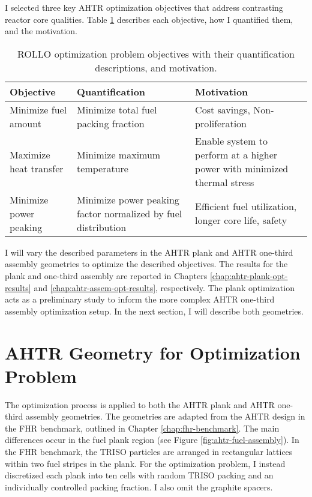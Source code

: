 I selected three key \gls{AHTR} optimization objectives that address contrasting reactor 
core qualities. 
Table \ref{tab:objectives} describes each objective, how I quantified them, and the motivation.
\begin{table}[]
    \centering
    \onehalfspacing
    \caption{\acrfull{ROLLO} optimization problem objectives with their quantification 
    descriptions, and motivation.}
	\label{tab:objectives}
    \footnotesize
    \begin{tabular}{p{4cm}|p{5cm}p{5cm}}
    \hline 
    \textbf{Objective}& \textbf{Quantification}& \textbf{Motivation} \\
    \hline
    Minimize fuel amount & Minimize total fuel packing fraction & Cost savings, Non-proliferation \\ 
    \hline
    Maximize heat transfer & Minimize maximum temperature & Enable system to perform at a higher power with minimized thermal stress \\
    \hline
    Minimize power peaking & Minimize power peaking factor normalized by fuel distribution & Efficient fuel utilization, longer core life, safety\\
    \hline
    \end{tabular}
\end{table}
I will vary the described parameters in the \gls{AHTR} plank and \gls{AHTR} one-third assembly 
geometries to optimize the described objectives.
The results for the plank and one-third assembly are reported in Chapters \ref{chap:ahtr-plank-opt-results}
and \ref{chap:ahtr-assem-opt-results}, respectively. 
The plank optimization acts as a preliminary study to inform the more complex \gls{AHTR} one-third
assembly optimization setup. 
In the next section, I will describe both geometries. 

\section{AHTR Geometry for Optimization Problem}
The optimization process is applied to both the \gls{AHTR} plank and \gls{AHTR} one-third
assembly geometries.
The geometries are adapted from the \gls{AHTR} design in the \gls{FHR} benchmark,
outlined in Chapter \ref{chap:fhr-benchmark}.
The main differences occur in the fuel plank region (see Figure \ref{fig:ahtr-fuel-assembly}). 
In the \gls{FHR} benchmark, the TRISO particles are arranged in rectangular lattices within
two fuel stripes in the plank. 
For the optimization problem, I instead discretized each plank into ten cells with random 
TRISO packing and an individually controlled packing fraction. 
I also omit the graphite spacers. 

